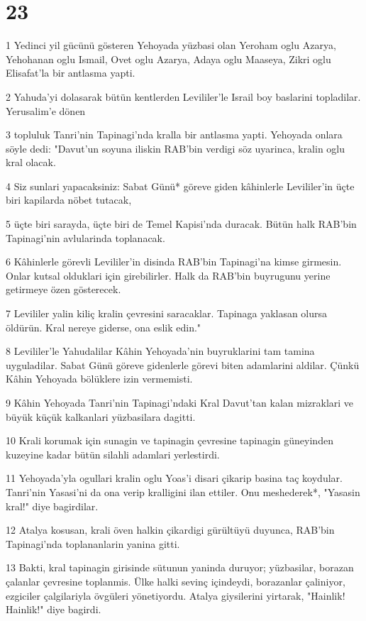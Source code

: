 \chapter{23}

\par 1 Yedinci yil gücünü gösteren Yehoyada yüzbasi olan Yeroham oglu Azarya, Yehohanan oglu Ismail, Ovet oglu Azarya, Adaya oglu Maaseya, Zikri oglu Elisafat'la bir antlasma yapti.
\par 2 Yahuda'yi dolasarak bütün kentlerden Levililer'le Israil boy baslarini topladilar. Yerusalim'e dönen
\par 3 topluluk Tanri'nin Tapinagi'nda kralla bir antlasma yapti. Yehoyada onlara söyle dedi: "Davut'un soyuna iliskin RAB'bin verdigi söz uyarinca, kralin oglu kral olacak.
\par 4 Siz sunlari yapacaksiniz: Sabat Günü* göreve giden kâhinlerle Levililer'in üçte biri kapilarda nöbet tutacak,
\par 5 üçte biri sarayda, üçte biri de Temel Kapisi'nda duracak. Bütün halk RAB'bin Tapinagi'nin avlularinda toplanacak.
\par 6 Kâhinlerle görevli Levililer'in disinda RAB'bin Tapinagi'na kimse girmesin. Onlar kutsal olduklari için girebilirler. Halk da RAB'bin buyrugunu yerine getirmeye özen gösterecek.
\par 7 Levililer yalin kiliç kralin çevresini saracaklar. Tapinaga yaklasan olursa öldürün. Kral nereye giderse, ona eslik edin."
\par 8 Levililer'le Yahudalilar Kâhin Yehoyada'nin buyruklarini tam tamina uyguladilar. Sabat Günü göreve gidenlerle görevi biten adamlarini aldilar. Çünkü Kâhin Yehoyada bölüklere izin vermemisti.
\par 9 Kâhin Yehoyada Tanri'nin Tapinagi'ndaki Kral Davut'tan kalan mizraklari ve büyük küçük kalkanlari yüzbasilara dagitti.
\par 10 Krali korumak için sunagin ve tapinagin çevresine tapinagin güneyinden kuzeyine kadar bütün silahli adamlari yerlestirdi.
\par 11 Yehoyada'yla ogullari kralin oglu Yoas'i disari çikarip basina taç koydular. Tanri'nin Yasasi'ni da ona verip kralligini ilan ettiler. Onu meshederek*, "Yasasin kral!" diye bagirdilar.
\par 12 Atalya kosusan, krali öven halkin çikardigi gürültüyü duyunca, RAB'bin Tapinagi'nda toplananlarin yanina gitti.
\par 13 Bakti, kral tapinagin girisinde sütunun yaninda duruyor; yüzbasilar, borazan çalanlar çevresine toplanmis. Ülke halki sevinç içindeydi, borazanlar çaliniyor, ezgiciler çalgilariyla övgüleri yönetiyordu. Atalya giysilerini yirtarak, "Hainlik! Hainlik!" diye bagirdi.
